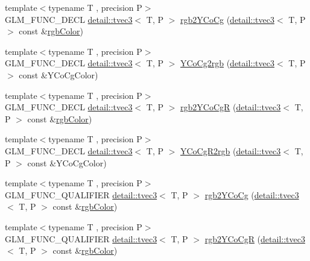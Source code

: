\begin{DoxyCompactItemize}
\item 
{\footnotesize template$<$typename T , precision P$>$ }\\G\+L\+M\+\_\+\+F\+U\+N\+C\+\_\+\+D\+E\+CL \hyperlink{structglm_1_1detail_1_1tvec3}{detail\+::tvec3}$<$ T, P $>$ \hyperlink{group__gtx__color__space___y_co_cg_ga2a235b86e67866fd9fef640bcc47c93d}{rgb2\+Y\+Co\+Cg} (\hyperlink{structglm_1_1detail_1_1tvec3}{detail\+::tvec3}$<$ T, P $>$ const \&\hyperlink{group__gtx__color__space_gafe29cc37c2675aee66c9f9ae3e5e7294}{rgb\+Color})
\item 
{\footnotesize template$<$typename T , precision P$>$ }\\G\+L\+M\+\_\+\+F\+U\+N\+C\+\_\+\+D\+E\+CL \hyperlink{structglm_1_1detail_1_1tvec3}{detail\+::tvec3}$<$ T, P $>$ \hyperlink{group__gtx__color__space___y_co_cg_gab40e31e352d2d318d3f062df2882c500}{Y\+Co\+Cg2rgb} (\hyperlink{structglm_1_1detail_1_1tvec3}{detail\+::tvec3}$<$ T, P $>$ const \&Y\+Co\+Cg\+Color)
\item 
{\footnotesize template$<$typename T , precision P$>$ }\\G\+L\+M\+\_\+\+F\+U\+N\+C\+\_\+\+D\+E\+CL \hyperlink{structglm_1_1detail_1_1tvec3}{detail\+::tvec3}$<$ T, P $>$ \hyperlink{group__gtx__color__space___y_co_cg_gaeee43c2a06fe63d46a96cee4d1c63ce6}{rgb2\+Y\+Co\+CgR} (\hyperlink{structglm_1_1detail_1_1tvec3}{detail\+::tvec3}$<$ T, P $>$ const \&\hyperlink{group__gtx__color__space_gafe29cc37c2675aee66c9f9ae3e5e7294}{rgb\+Color})
\item 
{\footnotesize template$<$typename T , precision P$>$ }\\G\+L\+M\+\_\+\+F\+U\+N\+C\+\_\+\+D\+E\+CL \hyperlink{structglm_1_1detail_1_1tvec3}{detail\+::tvec3}$<$ T, P $>$ \hyperlink{group__gtx__color__space___y_co_cg_ga7b90b9b5758dbe96a82a2ef8237a17e9}{Y\+Co\+Cg\+R2rgb} (\hyperlink{structglm_1_1detail_1_1tvec3}{detail\+::tvec3}$<$ T, P $>$ const \&Y\+Co\+Cg\+Color)
\item 
{\footnotesize template$<$typename T , precision P$>$ }\\G\+L\+M\+\_\+\+F\+U\+N\+C\+\_\+\+Q\+U\+A\+L\+I\+F\+I\+ER \hyperlink{structglm_1_1detail_1_1tvec3}{detail\+::tvec3}$<$ T, P $>$ \hyperlink{group__gtx__color__space___y_co_cg_ga2a235b86e67866fd9fef640bcc47c93d}{rgb2\+Y\+Co\+Cg} (\hyperlink{structglm_1_1detail_1_1tvec3}{detail\+::tvec3}$<$ T, P $>$ const \&\hyperlink{group__gtx__color__space_gafe29cc37c2675aee66c9f9ae3e5e7294}{rgb\+Color})
\item 
{\footnotesize template$<$typename T , precision P$>$ }\\G\+L\+M\+\_\+\+F\+U\+N\+C\+\_\+\+Q\+U\+A\+L\+I\+F\+I\+ER \hyperlink{structglm_1_1detail_1_1tvec3}{detail\+::tvec3}$<$ T, P $>$ \hyperlink{group__gtx__color__space___y_co_cg_gaeee43c2a06fe63d46a96cee4d1c63ce6}{rgb2\+Y\+Co\+CgR} (\hyperlink{structglm_1_1detail_1_1tvec3}{detail\+::tvec3}$<$ T, P $>$ const \&\hyperlink{group__gtx__color__space_gafe29cc37c2675aee66c9f9ae3e5e7294}{rgb\+Color})

\end{DoxyCompactItemize}
